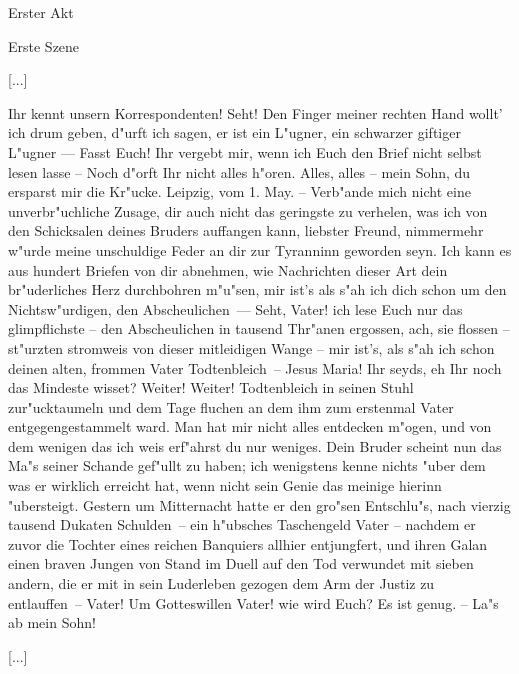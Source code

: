 
\begin{center}

\Large{Erster Akt}

\large{Erste Szene}

\end{center}


[...]

\begin{drama}

\franspeaks {} Ihr kennt unsern Korrespondenten! Seht! Den Finger meiner rechten Hand wollt' ich drum geben, d"urft ich sagen, er ist ein L"ugner, ein schwarzer giftiger L"ugner --- Fasst Euch! Ihr vergebt mir, wenn ich Euch den Brief nicht selbst lesen lasse -- Noch d"orft Ihr nicht alles h"oren.
\moorspeaks Alles, alles -- mein Sohn, du ersparst mir die Kr"ucke.
\franspeaks {} \frqq Leipzig, vom 1. May. -- Verb"ande mich nicht eine unverbr"uchliche Zusage, dir auch nicht das geringste zu verhelen, was ich von den Schicksalen deines Bruders auffangen kann, liebster Freund, nimmermehr w"urde meine unschuldige Feder an dir zur Tyranninn geworden seyn. Ich kann es aus hundert Briefen von dir abnehmen, wie Nachrichten dieser Art dein br"uderliches Herz durchbohren m"u"sen, mir ist's als s"ah ich dich schon um den Nichtsw"urdigen, den Abscheulichen\flqq \ ---  Seht, Vater! ich lese Euch nur das glimpflichste -- \frqq den Abscheulichen in tausend Thr"anen ergossen\flqq , ach, sie flossen -- st"urzten stromweis von dieser mitleidigen Wange -- \frqq mir ist's, als s"ah ich schon deinen alten, frommen Vater Todtenbleich\flqq \ -- Jesus Maria! Ihr seyds, eh Ihr noch das Mindeste wisset?
\moorspeaks Weiter! Weiter!
\franspeaks \frqq Todtenbleich in seinen Stuhl zur"ucktaumeln und dem Tage fluchen an dem ihm zum erstenmal Vater entgegengestammelt ward. Man hat mir nicht alles entdecken m"ogen, und von dem wenigen das ich weis erf"ahrst du nur weniges. Dein Bruder scheint nun das Ma"s seiner Schande gef"ullt zu haben; ich wenigstens kenne nichts "uber dem was er wirklich erreicht hat, wenn nicht sein Genie das meinige hierinn "ubersteigt. Gestern um Mitternacht hatte er den gro"sen Entschlu"s, nach vierzig tausend Dukaten Schulden\flqq \ -- ein h"ubsches Taschengeld Vater -- \frqq nachdem er zuvor die Tochter eines reichen Banquiers allhier entjungfert, und ihren Galan einen braven Jungen von Stand im Duell auf den Tod verwundet mit sieben andern, die er mit in sein Luderleben gezogen dem Arm der Justiz zu entlauffen\flqq \ -- Vater! Um Gotteswillen Vater! wie wird Euch?
\moorspeaks Es ist genug. -- La"s ab mein Sohn!

\end{drama}

[...]

\endinput